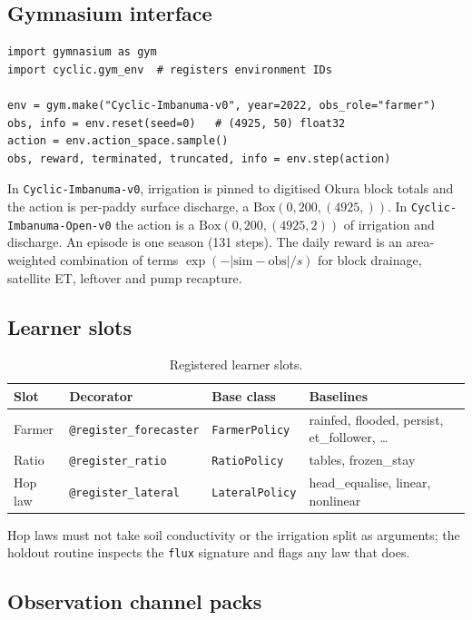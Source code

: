 \documentclass[preprint,12pt,authoryear,review]{elsarticle}
\begin{document}
\subsection{Gymnasium interface}

\begin{lstlisting}
import gymnasium as gym
import cyclic.gym_env  # registers environment IDs

env = gym.make("Cyclic-Imbanuma-v0", year=2022, obs_role="farmer")
obs, info = env.reset(seed=0)   # (4925, 50) float32
action = env.action_space.sample()
obs, reward, terminated, truncated, info = env.step(action)
\end{lstlisting}

In \texttt{Cyclic-Imbanuma-v0}, irrigation is pinned to digitised Okura block totals and the action is per-paddy surface discharge, a $\mathrm{Box}(0,200,(4925,))$. In \texttt{Cyclic-Imbanuma-Open-v0} the action is a $\mathrm{Box}(0,200,(4925,2))$ of irrigation and discharge. An episode is one season (131 steps). The daily reward is an area-weighted combination of terms $\exp(-|\mathrm{sim}-\mathrm{obs}|/s)$ for block drainage, satellite ET, leftover and pump recapture.

\subsection{Learner slots}

\begin{table}[htbp]
\centering
\footnotesize
\caption{Registered learner slots.}
\label{tab:slots}
\begin{tabular}{llll}
\toprule
Slot & Decorator & Base class & Baselines \\
\midrule
Farmer & \texttt{@register\_forecaster} & \texttt{FarmerPolicy} & rainfed, flooded, persist, et\_follower, \ldots \\
Ratio & \texttt{@register\_ratio} & \texttt{RatioPolicy} & tables, frozen\_stay \\
Hop law & \texttt{@register\_lateral} & \texttt{LateralPolicy} & head\_equalise, linear, nonlinear \\
\bottomrule
\end{tabular}
\end{table}

Hop laws must not take soil conductivity or the irrigation split as arguments; the holdout routine inspects the \texttt{flux} signature and flags any law that does.

\subsection{Observation channel packs}
\end{document}
